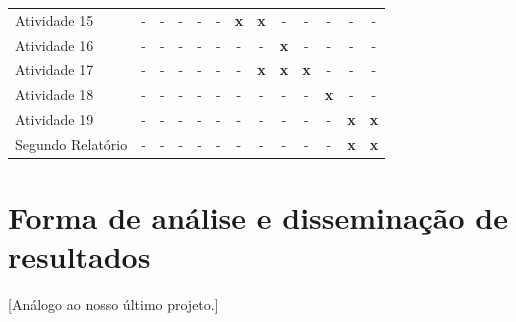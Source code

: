 \documentclass[12pt]{article}
\begin{document}
\begin{table}[!ht]
\begin{center}
{\begin{tabular}{l ccc ccc ccc ccc}
    \small Atividade 15
    & \small - & \small - & \small - & \small -  
    & \small - & \small {\bf x} & \small {\bf x} & \small -
    & \small - & \small - & \small - & \small - \\ 

    \small Atividade 16
    & \small - & \small - & \small - & \small -  
    & \small - & \small - & \small - & \small {\bf x}
    & \small - & \small - & \small - & \small - \\ 

    \small Atividade 17
    & \small - & \small - & \small - & \small -  
    & \small - & \small - & \small {\bf x} & \small {\bf x}
    & \small {\bf x} & \small - & \small - & \small - \\ 

    \small Atividade 18
    & \small - & \small - & \small - & \small -  
    & \small - & \small - & \small - & \small -
    & \small - & \small {\bf x} & \small - & \small - \\ 


    \small Atividade 19
    & \small - & \small - & \small - & \small -  
    & \small - & \small - & \small - & \small -
    & \small - & \small - & \small {\bf x} & \small {\bf x} \\ 



    \small Segundo Relatório
    & \small - & \small - & \small - & \small -  
    & \small - & \small - & \small - & \small -
    & \small - & \small - & \small {\bf x} & \small {\bf x} \\ 


    \bottomrule


\end{tabular}
}
\end{center}
\end{table}




\section{Forma de análise e disseminação de resultados}

{\color{blue}[Análogo ao nosso último projeto.]}


 

\end{document}

